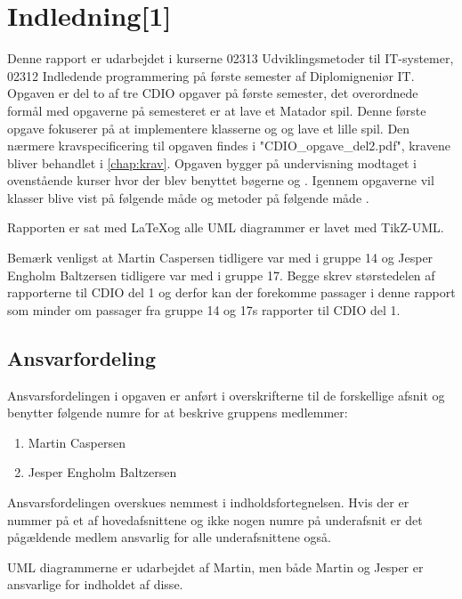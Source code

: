 \chapter{Indledning[1]}\label{chap:indledning}
Denne rapport er udarbejdet i kurserne 02313 Udviklingsmetoder til IT-systemer, 02312 Indledende programmering på første semester af Diplomigneniør IT. Opgaven er del to af tre CDIO opgaver på første semester, det overordnede formål med opgaverne på semesteret er at lave et Matador spil. Denne første opgave fokuserer på at implementere klasserne  og  og lave et lille spil. Den nærmere kravspecificering til opgaven findes i "CDIO\_opgave\_del2.pdf"\cite{CDIOdel2}, kravene bliver behandlet i \vref{chap:krav}. Opgaven bygger på undervisning modtaget i ovenstående kurser hvor der blev benyttet bøgerne \cite{umlbook} og \cite{javabook}. Igennem opgaverne vil klasser blive vist på følgende måde  og metoder på følgende måde .

Rapporten er sat med \LaTeX og alle UML diagrammer er lavet med TikZ-UML.

Bemærk venligst at Martin Caspersen tidligere var med i gruppe 14 og Jesper Engholm Baltzersen tidligere var med i gruppe 17. Begge skrev størstedelen af rapporterne til CDIO del 1 og derfor kan der forekomme passager i denne rapport som minder om passager fra gruppe 14 og 17s rapporter til CDIO del 1.

\section{Ansvarfordeling}\label{sec:indledning:ansvarsfordeling}

Ansvarsfordelingen i opgaven er anført i overskrifterne til de forskellige afsnit og benytter følgende numre for at beskrive gruppens medlemmer:
\begin{enumerate}
\item Martin Caspersen
\item Jesper Engholm Baltzersen
\end{enumerate}
Ansvarsfordelingen overskues nemmest i indholdsfortegnelsen. Hvis der er nummer på et af hovedafsnittene og ikke nogen numre på underafsnit er det pågældende medlem ansvarlig for alle underafsnittene også.

UML diagrammerne er udarbejdet af Martin, men både Martin og Jesper er ansvarlige for indholdet af disse.

